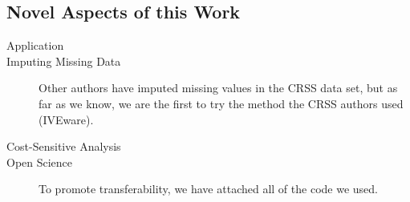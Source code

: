 \subsection{Novel Aspects of this Work}

\begin{description}
	\item [Application]  
	\item [Imputing Missing Data]  Other authors have imputed missing values in the CRSS data set, but as far as we know, we are the first to try the method the CRSS authors used (IVEware).
	\item [Cost-Sensitive Analysis]
	\item [Open Science] To promote transferability, we have attached all of the code we used.
\end{description}